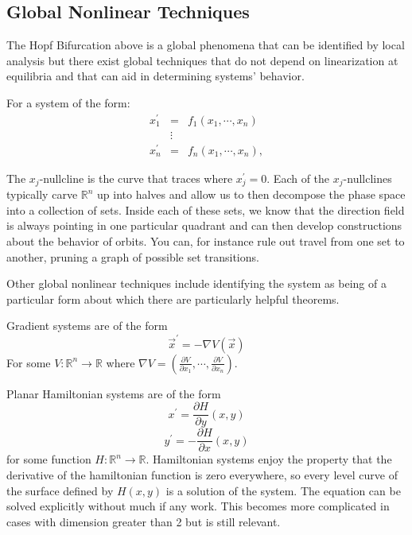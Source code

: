 \documentclass{elsart}
\begin{document}
\subsection{ Global Nonlinear Techniques }
The Hopf Bifurcation above is a global phenomena that can be identified by
local analysis but there exist global techniques that do not depend on
linearization at equilibria and that can aid in determining systems' behavior.

For a system of the form:
\[\begin{array}{ccc}
x_{1}^{\prime} & = & f_{1}(x_{1}, \cdots, x_{n}) \\
& \vdots & \\
x_{n}^{\prime} & = & f_{n}(x_{1}, \cdots, x_{n}), \end{array} \] 

The $x_{j}$-nullcline is the curve that traces where $x_{j}^{\prime} = 0$.  Each of the $x_{j}$-nullclines typically carve $\mathbb{R}^{n}$ up into halves
and allow us to then decompose the phase space into a collection of sets.
Inside each of these sets, we know that the direction field is always pointing
in one particular quadrant and can then develop constructions about the behavior
of orbits.  You can, for instance rule out travel from one set to another, 
pruning a graph of possible set transitions.


Other global nonlinear techniques include identifying the system as
being of a particular form about which there are particularly helpful theorems.

Gradient systems are of the form
$$\vec{x}^{\prime} = -\nabla V(\vec{x})$$
For some $V : \mathbb{R}^{n} \rightarrow \mathbb{R}$ where $\nabla V = \left( \frac{\partial V}{\partial x_{1}},\cdots,\frac{\partial V}{\partial x_{n}}  \right)$.  

Planar Hamiltonian systems are of the form
$$x^{\prime} = \frac{\partial H}{\partial y}(x,y)$$
$$y^{\prime} = -\frac{\partial H}{\partial x}(x,y)$$
for some function $H : \mathbb{R}^{n} \rightarrow \mathbb{R}$.  Hamiltonian systems enjoy the property that the derivative of the hamiltonian function is 
zero everywhere, so every level curve of the surface defined by $H(x,y)$ is
a solution of the system.  The equation can be solved explicitly without much
if any work.  This becomes more complicated in cases with dimension greater
than 2 but is still relevant.
\end{document}
